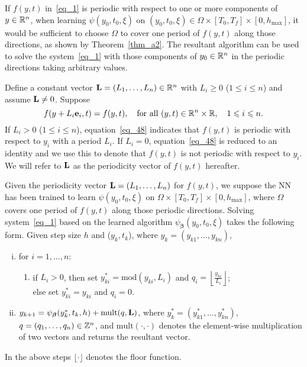 \begin{remark}\label{rem_210}
  If $f(y,t)$ in~\eqref{eq_1} is periodic with respect to
  one or more components of $y\in\mathbb{R}^n$,
  when learning $\psi(y_0,t_0,\xi)$ on
  $(y_0,t_0,\xi)\in\Omega\times[T_0,T_f]\times[0,h_{\max}]$,
  it would be sufficient to choose $\Omega$ to cover
  one period of $f(y,t)$ along those directions, as shown by Theorem~\ref{thm_a2}.
  The resultant algorithm can be used to solve the system~\eqref{eq_1}
  with those components of $y_0\in\mathbb{R}^n$
  in the periodic directions taking arbitrary values.

  Define a constant vector $\mathbf{L}=(L_1,\dots,L_n)\in\mathbb{R}^n$
  with $L_i\geqslant 0$ ($1\leqslant i\leqslant n$) and assume $\mathbf{L}\neq 0$.
  Suppose
  \begin{equation}\label{eq_48}
    f(y+L_i\mathbf{e}_i, t) = f(y,t), \quad
    \text{for all}\ (y,t)\in\mathbb{R}^n\times\mathbb{R}, \quad
    1\leqslant i\leqslant n.
  \end{equation}
  If $L_i>0$ ($1\leqslant i\leqslant n$),
  equation~\eqref{eq_48} indicates that
  $f(y,t)$ is periodic with respect to $y_i$
  with a period $L_i$.
  If $L_i=0$, equation~\eqref{eq_48} is reduced to an identity and
  we use this to denote that $f(y,t)$ is
  not periodic with respect to $y_i$.
  We will refer to $\mathbf{L}$ as the periodicity vector of $f(y,t)$ hereafter.


  Given the periodicity vector $\mathbf{L}=(L_1,\dots,L_n)$ for $f(y,t)$,
  we suppose the NN has been trained to learn
  $\psi(y_0,t_0,\xi)$ on $\Omega\times[T_0,T_f]\times[0,h_{\max}]$,
  where $\Omega$ covers one period of $f(y,t)$ along those
  periodic directions.  Solving
  system~\eqref{eq_1} based on the learned
  algorithm $\psi_{\bm\beta}(y_0,t_0,\xi)$ takes the following form.
  Given step size $h$ and ($y_k,t_k$), where $y_k=(y_{k1},\dots,y_{kn})$,
  \begin{enumerate}[(i),nosep] 
  \item for $i=1,\dots,n$:
    \begin{enumerate}[,nosep]
    \item if $L_i>0$, then set $y_{ki}^*=\mathrm{mod}(y_{ki},L_i)$
      and $q_i=\left\lfloor \frac{y_{ki}}{L_i}\right\rfloor$; \\
      else set $y_{ki}^*=y_{ki}$ and $q_i=0$.
    \end{enumerate}
    
  \item
    $y_{k+1} = \psi_{\bm\beta}(y_k^*,t_k,h) + \mathrm{mult}(q,\mathbf{L})$, where
    $y_k^*=(y_{k1}^*,\dots,y_{kn}^*)$,
    $q=(q_1,\dots,q_n)\in\mathbb{Z}^n$, and $\mathrm{mult}(\cdot,\cdot)$ denotes
    the element-wise multiplication of two vectors and returns the resultant
    vector.

  \end{enumerate}
  In the above steps $\lfloor\cdot\rfloor$ denotes the floor function.
  

\end{remark}


